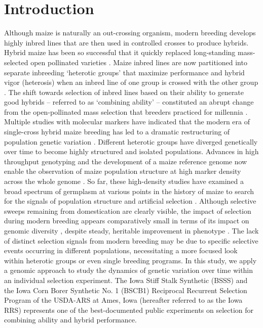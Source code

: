\section*{Introduction}
Although maize is naturally an out-crossing organism, modern breeding develops highly inbred lines that are then used in controlled crosses to produce hybrids. 
Hybrid maize has been so successful that it quickly replaced long-standing mass-selected open pollinated varieties \citep{crabb1947hybrid}. 
Maize inbred lines are now partitioned into separate inbreeding ‘heterotic groups’ that maximize performance and hybrid vigor (heterosis) when an inbred line of one group is crossed with the other group \citep{tracy2006historical}. 
The shift towards selection of inbred lines based on their ability to generate good hybrids – referred to as ‘combining ability’ – constituted an abrupt change from the open-pollinated mass selection that breeders practiced for millennia \citep{Anderson, 1944; troyer1999background}.
Multiple studies with molecular markers have indicated that the modern era of single-cross hybrid maize breeding has led to a dramatic restructuring of population genetic variation \citep{duvick2004long, ho2005extent, feng2006temporal}. 
Different heterotic groups have diverged genetically over time to become highly structured and isolated populations. 
Advances in high throughput genotyping and the development of a maize reference genome now enable the observation of maize population structure at high marker density across the whole genome \citep{ganal2011a-large,chia2012maize}. 
So far, these high-density studies have examined a broad spectrum of germplasm at various points in the history of maize to search for the signals of population structure and artificial selection \citep{Hufford2012b, van2012historical}. 
Although selective sweeps remaining from domestication are clearly visible, the impact of selection during modern breeding appears comparatively small in terms of its impact on genomic diversity \citep{Hufford2012b,van2012historical}, despite steady, heritable improvement in phenotype \citep{duvick2005contribution}. 
The lack of distinct selection signals from modern breeding may be due to specific selective events occurring in different populations, necessitating a more focused look within heterotic groups or even single breeding programs. 
In this study, we apply a genomic approach to study the dynamics of genetic variation over time within an individual selection experiment. 
The Iowa Stiff Stalk Synthetic (BSSS) and the Iowa Corn Borer Synthetic No. 1 (BSCB1) Reciprocal Recurrent Selection Program of the USDA-ARS at Ames, Iowa (hereafter referred to as the Iowa RRS) represents one of the best-documented public experiments on selection for combining ability and hybrid performance. 
